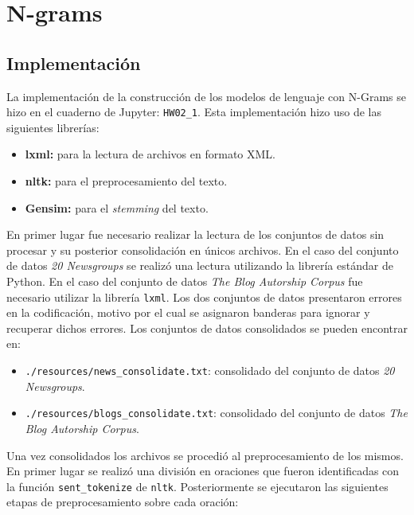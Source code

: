 \section{N-grams}

\subsection{Implementación}
La implementación de la construcción de los modelos de lenguaje con N-Grams se hizo en el cuaderno de Jupyter: \texttt{HW02\_1}. Esta implementación hizo uso de las siguientes librerías:

\begin{itemize}
    \item \textbf{lxml:} para la lectura de archivos en formato XML.
    \item \textbf{nltk:} para el preprocesamiento del texto.
    \item \textbf{Gensim:} para el \textit{stemming} del texto.
\end{itemize}

En primer lugar fue necesario realizar la lectura de los conjuntos de datos sin procesar y su posterior consolidación en únicos archivos. En el caso del conjunto de datos \textit{20 Newsgroups} se realizó una lectura utilizando la librería estándar de Python. En el caso del conjunto de datos \textit{The Blog Autorship Corpus} fue necesario utilizar la librería \texttt{lxml}. Los dos conjuntos de datos presentaron errores en la codificación, motivo por el cual se asignaron banderas para ignorar y recuperar dichos errores. Los conjuntos de datos consolidados se pueden encontrar en:

\begin{itemize}
    \item \texttt{./resources/news\_consolidate.txt}: consolidado del conjunto de datos \textit{20 Newsgroups}.
    \item \texttt{./resources/blogs\_consolidate.txt}: consolidado del conjunto de datos \textit{The Blog Autorship Corpus}.
\end{itemize}

Una vez consolidados los archivos se procedió al preprocesamiento de los mismos. En primer lugar se realizó una división en oraciones que fueron identificadas con la función \texttt{sent\_tokenize} de \texttt{nltk}. Posteriormente se ejecutaron las siguientes etapas de preprocesamiento sobre cada oración:

